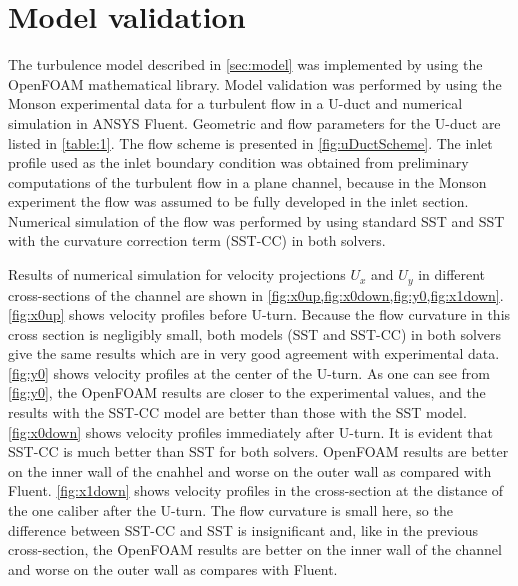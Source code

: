 \documentclass[a4paper]{jpconf}
\begin{document}
\section{Model validation}

The turbulence model described in \cref{sec:model} was implemented by using the OpenFOAM{\textregistered} mathematical library. Model validation was performed by using the Monson \cite{Monson} experimental data for a turbulent flow in a U-duct and numerical simulation in ANSYS Fluent{\textregistered}. Geometric and flow parameters for the U-duct are listed in \cref{table:1}. The flow scheme is presented in \cref{fig:uDuctScheme}.
The inlet profile used as the inlet boundary condition was obtained from preliminary 
computations of the turbulent flow in a plane channel, because in the Monson experiment \cite{Monson} the 
flow was assumed to be fully developed in the inlet section. Numerical simulation of the flow 
was performed by using standard SST and SST with the curvature correction term (SST-CC) in 
both solvers.

Results of numerical simulation for velocity projections $U_x$ and $U_y$ in different cross-sections of the channel are shown in \cref{fig:x0up,fig:x0down,fig:y0,fig:x1down}. \cref{fig:x0up} shows velocity profiles before U-turn. Because the flow curvature in this cross section is negligibly small, both models (SST and SST-CC) in both solvers give the same results which are in very good agreement with experimental data. \cref{fig:y0}  shows velocity  profiles at the center of the U-turn. As one can see from \cref{fig:y0}, the OpenFOAM{\textregistered} results are closer to the experimental values, and the results with the SST-CC model are better than those with the SST model. \cref{fig:x0down} shows velocity profiles immediately after U-turn. It is evident that SST-CC is much better than SST for both solvers. OpenFOAM{\textregistered} results are better on the inner wall of the cnahhel and worse on the outer wall as compared with Fluent{\textregistered}. \cref{fig:x1down} shows velocity profiles in the cross-section at the distance of the one caliber after the U-turn. The flow curvature is small here, so the difference between SST-CC and SST is insignificant and, like in the previous cross-section, the OpenFOAM{\textregistered} results are better on the inner wall of the channel and worse on the outer wall as compares with Fluent{\textregistered}.
\end{document}
